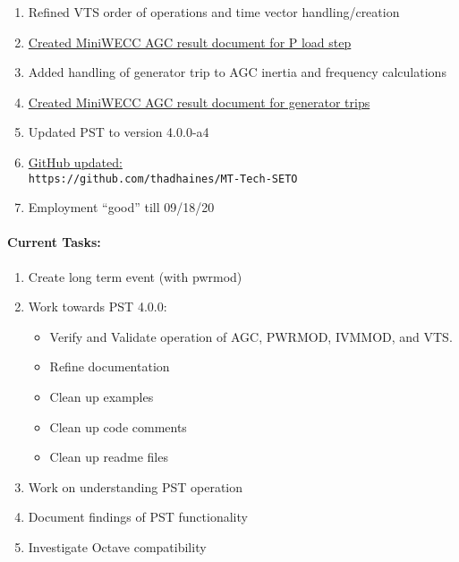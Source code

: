 \documentclass[12pt]{article}
\begin{document}
\begin{multicols}{2}
\begin{enumerate}
		\item Refined VTS order of operations and time vector handling/creation
		\item \href{https://github.com/thadhaines/MT-Tech-SETO/blob/master/researchDocs/TEX/one-offs/200817-AGCminiWECC10min/200817-AGCminiWECC10min.pdf}{Created MiniWECC AGC result document for P load step}
		\item Added handling of generator trip to AGC inertia and frequency calculations
		\item \href{https://github.com/thadhaines/MT-Tech-SETO/blob/master/researchDocs/TEX/one-offs/200818-AGCminiWECCgenTrips/200818-AGCminiWECCgenTrips.pdf}{Created MiniWECC AGC result document for generator trips}
		\item Updated PST to version 4.0.0-a4
		

		\item \href{https://github.com/thadhaines/MT-Tech-SETO}{GitHub updated:}\\
	{\footnotesize \verb|https://github.com/thadhaines/MT-Tech-SETO| }\\
	\item Employment ``good'' till 09/18/20
	\end{enumerate}

\paragraph{Current Tasks:}
	\begin{enumerate}
		\itemsep 0em 
	\item Create long term event (with pwrmod)
		\item Work towards PST 4.0.0:
		\begin{itemize}
		\footnotesize
		\itemsep0em
		\item Verify and Validate operation of AGC, PWRMOD, IVMMOD, and VTS.
		\item Refine documentation	
		\item Clean up examples
		\item Clean up code comments
		\item Clean up readme files
		\end{itemize}
		\item Work on understanding PST operation
		\item Document findings of PST functionality
		\item Investigate Octave compatibility
\end{enumerate}


\end{multicols}
\end{document}
